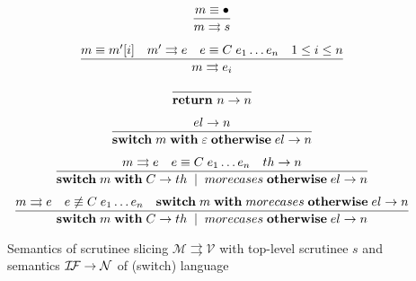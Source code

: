  \begin{figure}
    \[
    \begin{array}{cr}
      \dfrac{m \equiv \bullet} { m \rightrightarrows s} & 
        \\[5mm]
      \dfrac{m \equiv m'[i]\quad m'\rightrightarrows e\quad e\equiv C\;e_1\dots e_n\quad 1\le i\le n} { m \rightrightarrows e_i} & 
        \\[5mm]
      \dfrac{}{\mathbf{return}\ n \rightarrow n} &       
        \\[5mm]
      \dfrac{el \rightarrow n} {\mathbf{switch}\;m \; \mathbf{with}\;\varepsilon\;\mathbf{otherwise}\;el \rightarrow n} &       
        \\[5mm]
      \dfrac{m \rightrightarrows e \quad e\equiv C\; e_1\dots e_n\quad th \rightarrow n} {\mathbf{switch}\;m \; \mathbf{with}\;C\rightarrow th\; \mid\; morecases\;\mathbf{otherwise}\;el \rightarrow n} &       
        \\[5mm]
      \dfrac{m \rightrightarrows e \quad e\not\equiv C\; e_1\dots e_n\quad 
       {\mathbf{switch}\;m \; \mathbf{with}\; morecases\;\mathbf{otherwise}\;el } \rightarrow n} {\mathbf{switch}\;m \; \mathbf{with}\;C\rightarrow th\; \mid\; morecases\;\mathbf{otherwise}\;el \rightarrow n} &       
    \end{array}
    \]
    \caption{Semantics of scrutinee slicing $\mathcal{M} \rightrightarrows \mathcal{V}$ with top-level scrutinee $s$ and semantics $\mathcal{I\!F}\rightarrow \mathcal{N}$  of 
    (switch) language
    }
   \label{fig:ir_switch}
\end{figure}
